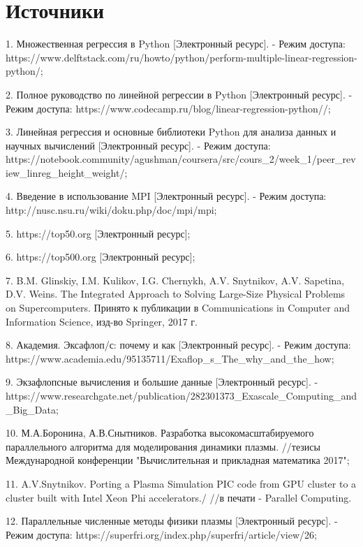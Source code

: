 \documentclass{article}
\begin{document}



\section{Источники}
1. Множественная регрессия в Python [Электронный ресурс].
   - Режим доступа: https://www.delftstack.com/ru/howto/python/perform-multiple-linear-regression-python/;

2. Полное руководство по линейной регрессии в Python [Электронный ресурс].
   - Режим доступа: https://www.codecamp.ru/blog/linear-regression-python//;

3. Линейная регрессия и основные библиотеки Python для анализа данных и научных вычислений [Электронный ресурс].
   - Режим доступа: https://notebook.community/agushman/coursera/src/cours_2/week_1/peer_review_linreg_height_weight/;

4. Введение в использование MPI [Электронный ресурс].
   - Режим доступа: http://nusc.nsu.ru/wiki/doku.php/doc/mpi/mpi;

5. https://top50.org [Электронный ресурс];

6. https://top500.org [Электронный ресурс];

7. B.M. Glinskiy, I.M. Kulikov, I.G. Chernykh, A.V. Snytnikov, A.V. Sapetina, D.V. Weins.  The Integrated Approach to Solving Large-Size Physical Problems on Supercomputers.
   Принято к публикации в Communications in Computer and Information Science, изд-во Springer, 2017 г.

8. Академия. Эксафлоп/с: почему и как [Электронный ресурс].
   - Режим доступа: https://www.academia.edu/95135711/Exaflop_s_The_why_and_the_how;

9. Экзафлопсные вычисления и большие данные [Электронный ресурс].
   - https://www.researchgate.net/publication/282301373_Exascale_Computing_and_Big_Data;

10. М.А.Боронина, А.В.Снытников. Разработка высокомасштабируемого параллельного алгоритма для моделирования динамики плазмы.
   //тезисы Международной конференции "Вычислительная и прикладная математика 2017";
   
11. A.V.Snytnikov.  Porting a Plasma Simulation PIC code from GPU cluster to a cluster built with Intel Xeon Phi accelerators./
   //в печати -  Parallel Computing.

12. Параллельные численные методы физики плазмы [Электронный ресурс].
   - Режим доступа: https://superfri.org/index.php/superfri/article/view/26;
\end{document}
